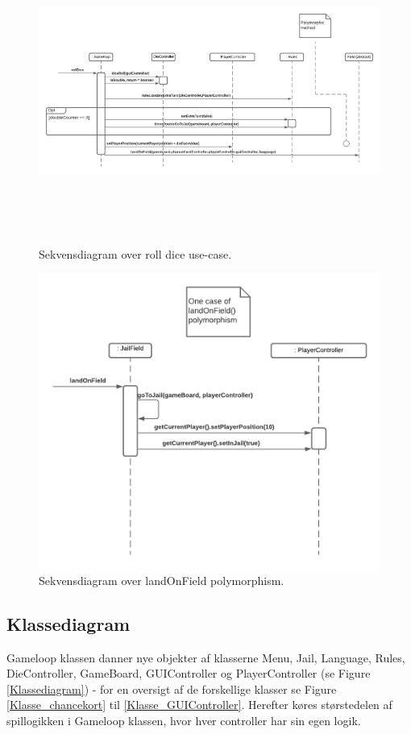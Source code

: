 \begin{flushleft}
\begin{figure}[H]
    \centering
    \includegraphics[width=16cm, height=10cm]{Report/figures/rollDice_sekvens.png}
    \caption{Sekvensdiagram over roll dice use-case.}
    \label{RollDice}
\end{figure}
\begin{figure}[H]
    \centering
    \includegraphics[width=13cm]{Report/figures/landOnField_sekvens.png}
    \caption{Sekvensdiagram over landOnField polymorphism.}
    \label{landOnField}
\end{figure}

\subsection{Klassediagram}
Gameloop klassen danner nye objekter af klasserne Menu, Jail, Language, Rules, DieController, GameBoard, GUIController og PlayerController (se Figure \ref{Klassediagram}) - for en oversigt af de forskellige klasser se Figure \ref{Klasse_chancekort} til \ref{Klasse_GUIController}. Herefter køres størstedelen af spillogikken i Gameloop klassen, hvor hver controller har sin egen logik.
\addlinespace[0.5cm]



\end{flushleft}
